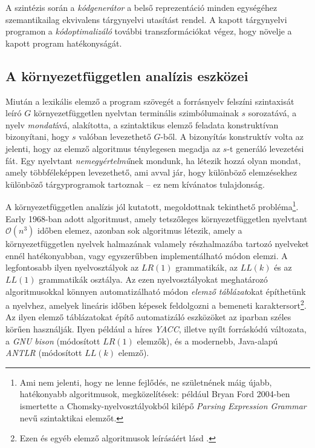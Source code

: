 A szintézis során a \textit{kódgenerátor} a belső reprezentáció minden egységéhez szemantikailag ekvivalens tárgynyelvi utasítást rendel.
A kapott tárgynyelvi programon a \textit{kódoptimalizáló} további transzformációkat végez, hogy növelje a kapott program hatékonyságát.


\subsection{A környezetfüggetlen analízis eszközei}
Miután a lexikális elemző a program szövegét a forrásnyelv felszíni szintaxisát leíró $G$ környezetfüggetlen nyelvtan terminális szimbólumainak $s$ sorozatává, a nyelv \textit{mondat}ává, alakította, a szintaktikus elemző feladata konstruktívan bizonyítani, hogy $s$ valóban levezethető $G$-ből.
A bizonyítás konstruktív volta az jelenti, hogy az elemző algoritmus ténylegesen megadja az $s$-t generáló levezetési fát.
Egy nyelvtant \textit{nemegyértelmű}nek mondunk, ha létezik hozzá olyan mondat, amely többféleképpen levezethető, ami avval jár, hogy különböző elemzésekhez különböző tárgyprogramok tartoznak -- ez nem kívánatos tulajdonság.

A környezetfüggetlen analízis jól kutatott, megoldottnak tekinthető probléma\footnote{
	Ami nem jelenti, hogy ne lenne fejlődés, ne születnének máig újabb, hatékonyabb algoritmusok, megközelítések: például Bryan Ford 2004-ben ismertette a Chomsky-nyelvosztályokból kilépő \textit{Parsing Expression Grammar} nevű szintaktikai elemzőt\cite{Ford04PEG}.
}.
Early 1968-ban adott algoritmust, amely tetszőleges környezetfüggetlen nyelvtant $\mathcal{O}(n^3)$ időben elemez, azonban sok algoritmus létezik, amely a környezetfüggetlen nyelvek halmazának valamely részhalmazába tartozó nyelveket ennél hatékonyabban, vagy egyszerűbben implementálható módon elemzi.
A legfontosabb ilyen nyelvosztályok az $LR(1)$ grammatikák, az $LL(k)$ és az $LL(1)$ grammatikák osztálya.
Az ezen nyelvosztályokat meghatározó algoritmusokkal könnyen automatizálható módon \textit{elemző táblázat}okat építhetünk a nyelvhez, amelyek lineáris időben képesek feldolgozni a bemeneti karaktersort\footnote{%
	Ezen és egyéb elemző algoritmusok leírásáért lásd \cite[4-6.~fejezetek]{Csornyei}.
}.
Az ilyen elemző táblázatokat építő automatizáló eszközöket az iparban széles körűen használják.
Ilyen például a híres \textit{YACC}, illetve nyílt forráskódú változata, a \textit{GNU bison} (módosított $LR(1)$ elemzők), és a modernebb, Java-alapú \textit{ANTLR} (módosított $LL(k)$ elemző).

